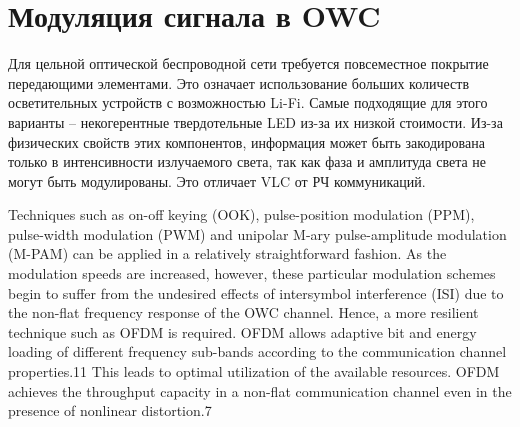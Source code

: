\chapter{Модуляция сигнала в OWC}

Для цельной оптической беспроводной сети требуется повсеместное покрытие передающими элементами. Это означает использование больших количеств осветительных устройств с возможностью Li-Fi. Самые подходящие для этого варианты \--- некогерентные твердотельные LED из-за их низкой стоимости. Из-за физических свойств этих компонентов, информация может быть закодирована только в интенсивности излучаемого света, так как фаза и амплитуда света не могут быть модулированы. Это отличает VLC от РЧ коммуникаций.




Techniques such as on-off keying (OOK), pulse-position modulation
(PPM), pulse-width modulation (PWM) and unipolar M-ary pulse-amplitude modulation (M-PAM) can be
applied in a relatively straightforward fashion. As the modulation speeds are increased, however, these particular
modulation schemes begin to suffer from the undesired effects of intersymbol interference (ISI) due to the non-flat
frequency response of the OWC channel. Hence, a more resilient technique such as OFDM is required. OFDM
allows adaptive bit and energy loading of different frequency sub-bands according to the communication channel
properties.11 This leads to optimal utilization of the available resources. OFDM achieves the throughput capacity
in a non-flat communication channel even in the presence of nonlinear distortion.7